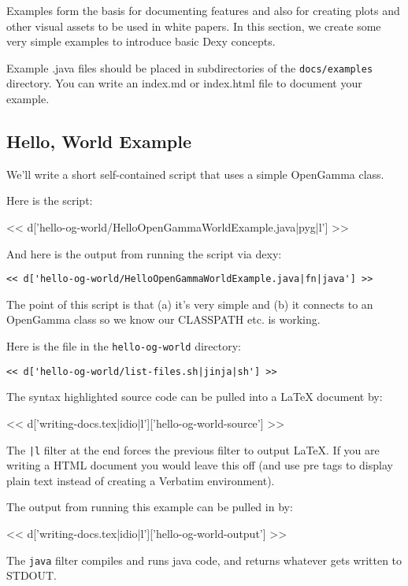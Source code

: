 Examples form the basis for documenting features and also for creating plots
and other visual assets to be used in white papers. In this section, we create
some very simple examples to introduce basic Dexy concepts.

Example .java files should be placed in subdirectories of the \verb|docs/examples|
directory. You can write an index.md or index.html file to document your example.

\subsection{Hello, World Example}

We'll write a short self-contained script that uses a simple OpenGamma class.

Here is the script:

<< d['hello-og-world/HelloOpenGammaWorldExample.java|pyg|l'] >>

And here is the output from running the script via dexy:

\begin{Verbatim}
<< d['hello-og-world/HelloOpenGammaWorldExample.java|fn|java'] >>
\end{Verbatim}

The point of this script is that (a) it's very simple and (b) it connects to an
OpenGamma class so we know our CLASSPATH etc. is working.

Here is the file in the \verb|hello-og-world| directory:

\begin{Verbatim}
<< d['hello-og-world/list-files.sh|jinja|sh'] >>
\end{Verbatim}

The syntax highlighted source code can be pulled into a LaTeX document by:

<< d['writing-docs.tex|idio|l']['hello-og-world-source'] >>

The \verb=|l= filter at the end forces the previous filter to output \LaTeX. If
you are writing a HTML document you would leave this off (and use \lt pre \gt tags to
display plain text instead of creating a Verbatim environment).

The output from running this example can be pulled in by:

<< d['writing-docs.tex|idio|l']['hello-og-world-output'] >>

The \verb|java| filter compiles and runs java code, and returns whatever gets written to STDOUT.

